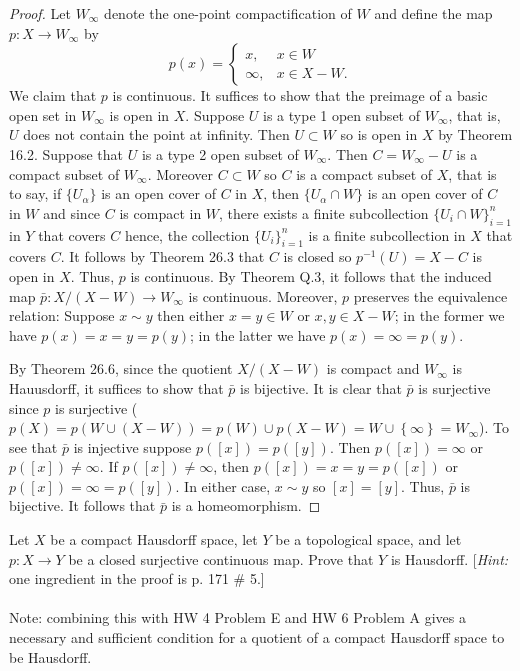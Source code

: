 \begin{proof}
Let $W_\infty$ denote the one-point compactification of $W$ and
define the map $p\colon X\to W_\infty$ by
\[
p(x)=\begin{cases}x,&x\in W\\\infty,&x\in X-W.\end{cases}
\]
We claim that $p$ is continuous. It suffices to show that the preimage of a
basic open set in $W_\infty$ is open in $X$. Suppose $U$ is a type 1 open
subset of $W_\infty$, that is, $U$ does not contain the point at
infinity. Then $U\subset W$ so is open in $X$ by Theorem 16.2. Suppose that
$U$ is a type 2 open subset of $W_\infty$. Then $C=W_\infty-U$ is a compact
subset of $W_\infty$. Moreover $C\subset W$ so $C$ is a compact subset of
$X$, that is to say, if $\{U_\alpha\}$ is an open cover of $C$ in $X$, then
$\{U_\alpha\cap W\}$ is an open cover of $C$ in $W$ and since $C$ is
compact in $W$, there exists a finite subcollection $\{U_i\cap W\}_{i=1}^n$
in $Y$ that covers $C$ hence, the collection $\{U_i\}_{i=1}^n$ is a finite
subcollection in $X$ that covers $C$. It follows by Theorem 26.3 that $C$
is closed so $p^{-1}(U)=X-C$ is open in $X$. Thus, $p$ is continuous. By
Theorem Q.3, it follows that the induced map $\bar p\colon X/(X-W)\to
W_\infty$ is continuous. Moreover, $p$ preserves the equivalence relation:
Suppose $x\sim y$ then either $x=y\in W$ or $x,y\in X-W$; in the former we
have $p(x)=x=y=p(y)$; in the latter we have $p(x)=\infty=p(y)$.

By Theorem 26.6, since the quotient $X/(X-W)$ is compact and $W_\infty$ is
Hauusdorff, it suffices to show that $\bar p$ is bijective. It is clear
that $\bar p$ is surjective since $p$ is surjective
($p(X)=p(W\cup(X-W))=p(W)\cup
p(X-W)=W\cup\left\{\infty\right\}=W_\infty$). To see that $\bar p$ is
injective suppose $p([x])=p([y])$. Then $p([x])=\infty$ or
$p([x])\neq\infty$. If $p([x])\neq\infty$, then $p([x])=x=y=p([x])$ or
$p([x])=\infty=p([y])$. In either case, $x\sim y$ so $[x]=[y]$. Thus, $\bar
p$ is bijective. It follows that $\bar p$ is a homeomorphism.
\end{proof}
\newpage
\begin{problem}[(B)]
Let $X$ be a compact Hausdorff space, let $Y$ be a topological
space, and let $p\colon X\to Y$ be a closed surjective continuous
map. Prove that $Y$ is Hausdorff. [\emph{Hint:} one ingredient in the
proof is p. 171 \# 5.]
\\\\
Note: combining this with HW 4 Problem E and HW 6 Problem A gives
a necessary and sufficient condition for a quotient of a compact
Hausdorff space to be Hausdorff.
\end{problem}
